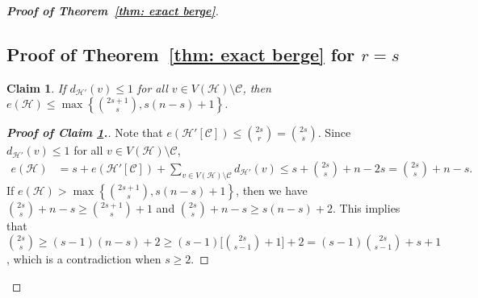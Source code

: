 \documentclass[11pt]{article}
\numberwithin{equation}{section}
\newtheorem{cla}{Claim}
\newcommand\cB{{\mathcal B}}
\newcommand\cC{{\mathcal C}}
\newcommand\cH{{\mathcal H}}
\begin{document}
\begin{proof}[\bf Proof of Theorem~\ref{thm: exact berge}]

    \subsection{\normalsize Proof of Theorem~\ref{thm: exact berge} for $r=s$}

    \begin{cla}\label{claim: outdegree at least 2}
        If $d_{\cH'}(v)\leq 1$ for all $v\in V(\cH)\setminus \cC$,  then $e(\cH)\leq \max\left\{\binom{2s+1}{s},s(n-s)+1\right\}$.
    \end{cla}
    \begin{proof}[{\bf Proof of Claim \ref{claim: outdegree at least 2}.}]
    Note that $e(\cH'[\cC])\leq \binom{2s}{r}=\binom{2s}{s}$. Since $d_{\cH'}(v)\leq 1$ for all $v\in V(\cH)\setminus \cC$,
    \begin{align*}
        e(\cH) &= s+e(\cH'[\cC])+\sum_{v\in V(\cH)\setminus \cC}d_{\cH'}(v)\leq s+\binom{2s}{s}+n-2s=\binom{2s}{s}+n-s.
    \end{align*}
    If $e(\cH)>\max\left\{\binom{2s+1}{s},s(n-s)+1\right\}$, then we have $\binom{2s}{s}+n-s\geq \binom{2s+1}{s}+1$ and $\binom{2s}{s}+n-s\geq s(n-s)+2$. This implies that $\binom{2s}{s}\geq (s-1)(n-s)+2\geq (s-1)\big[\binom{2s}{s-1}+1\big]+2=(s-1)\binom{2s}{s-1}+s+1$, which is a contradiction when $s\geq2$.
    \end{proof}


\end{proof}
\end{document}
